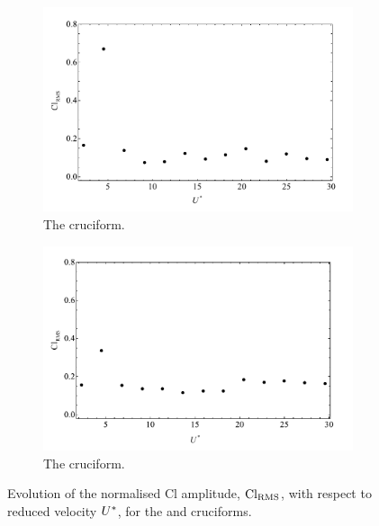 \documentclass[oneside]{utmthesis}
\begin{document}
\begin{figure}
  \centering
  \begin{subfigure}[h]{1\textwidth}
    \includegraphics[width=\textwidth]{figs/clRMS4}
    \caption{The \angfo{} cruciform.}
    \label{fig:clRMS4}
  \end{subfigure}
  
  \begin{subfigure}[h]{1\textwidth}
    \includegraphics[width=\textwidth]{figs/clRMS3}
    \caption{The \angth{} cruciform.}
    \label{fig:clRMS3}
  \end{subfigure}

  \label{fig:clRMS43}
  \caption{Evolution of the normalised Cl \rms{} amplitude, $\text{Cl}_{\text{RMS}}$, with respect to reduced velocity $U^{*}$, for the \angfo{} and \angth{} cruciforms.}
\end{figure}
\end{document}
